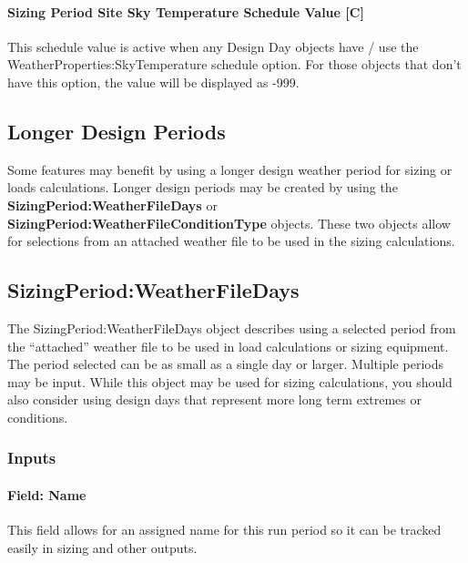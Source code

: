 \paragraph{Sizing Period Site Sky Temperature Schedule Value {[}C{]}}\label{sizing-period-site-sky-temperature-schedule-value-c}

This schedule value is active when any Design Day objects have / use the WeatherProperties:SkyTemperature schedule option. For those objects that don't have this option, the value will be displayed as -999.

\subsection{Longer Design Periods}\label{longer-design-periods}

Some features may benefit by using a longer design weather period for sizing or loads calculations. Longer design periods may be created by using the \textbf{Si\-zing\-Period:\-Weather\-File\-Days} or \textbf{Si\-zing\-Period:\-Weather\-File\-Con\-dition\-Type} objects. These two objects allow for selections from an attached weather file to be used in the sizing calculations.

\subsection{Sizing\-Period:\-Weather\-File\-Days}\label{sizingperiodweatherfiledays}

The Sizing\-Period:\-Weather\-File\-Days object describes using a selected period from the ``attached'' weather file to be used in load calculations or sizing equipment. The period selected can be as small as a single day or larger. Multiple periods may be input. While this object may be used for sizing calculations, you should also consider using design days that represent more long term extremes or conditions.

\subsubsection{Inputs}\label{inputs-2-022}

\paragraph{Field: Name}\label{field-name-2-021}

This field allows for an assigned name for this run period so it can be tracked easily in sizing and other outputs.

